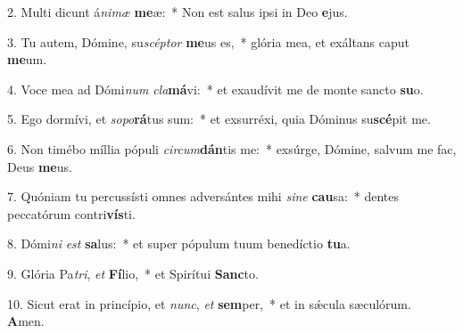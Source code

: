 2. Multi dicunt á\textit{ni}\textit{mæ} \textbf{me}æ:~*  Non est salus ipsi in Deo \textbf{e}jus.\

3. Tu autem, Dómine, su\textit{scép}\textit{tor} \textbf{me}us es,~*  glória mea, et exáltans caput \textbf{me}um.\

4. Voce mea ad Dómi\textit{num} \textit{cla}\textbf{má}vi:~*  et exaudívit me de monte sancto \textbf{su}o.\

5. Ego dormívi, et \textit{so}\textit{po}\textbf{rá}tus sum:~*  et exsurréxi, quia Dóminus su\textbf{scé}pit me.\

6. Non timébo míllia pópuli \textit{cir}\textit{cum}\textbf{dán}tis me:~*  exsúrge, Dómine, salvum me fac, Deus \textbf{me}us.\

7. Quóniam tu percussísti omnes adversántes mihi \textit{si}\textit{ne} \textbf{cau}sa:~*  dentes peccatórum contri\textbf{vís}ti.\

8. Dómi\textit{ni} \textit{est} \textbf{sa}lus:~*  et super pópulum tuum benedíctio \textbf{tu}a.\

9. Glória Pa\textit{tri}, \textit{et} \textbf{Fí}lio,~*  et Spirítui \textbf{Sanc}to.\

10. Sicut erat in princípio, et \textit{nunc}, \textit{et} \textbf{sem}per,~*  et in sǽcula sæculórum. \textbf{A}men.\

